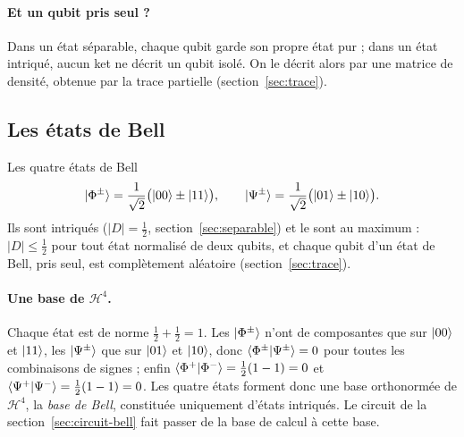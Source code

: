 \paragraph{Et un qubit pris seul ?} Dans un état séparable, chaque qubit garde son propre état pur ;
dans un état intriqué, aucun ket ne décrit un qubit isolé. On le décrit alors par une matrice de
densité, obtenue par la trace partielle (section~\ref{sec:trace}).

\subsection{Les états de Bell}\label{sec:bell}

\begin{definition}{Les quatre états de Bell}
\[
  |\Phi^{\pm}\rangle=\frac{1}{\sqrt2}\big(|00\rangle\pm|11\rangle\big),
  \qquad
  |\Psi^{\pm}\rangle=\frac{1}{\sqrt2}\big(|01\rangle\pm|10\rangle\big).
\]
Ils sont intriqués ($|D|=\frac12$, section~\ref{sec:separable}) et le sont au maximum :
$|D|\leq\frac12$ pour tout état normalisé de deux qubits, et chaque qubit d'un état de Bell,
pris seul, est complètement aléatoire (section~\ref{sec:trace}).
\end{definition}

\paragraph{Une base de $\mathcal{H}^4$.} Chaque état est de norme $\frac12+\frac12=1$. Les
$|\Phi^\pm\rangle$ n'ont de composantes que sur $|00\rangle$ et $|11\rangle$, les $|\Psi^\pm\rangle$ que sur
$|01\rangle$ et $|10\rangle$, donc $\langle \Phi^\pm|\Psi^\pm\rangle=0$ pour toutes les combinaisons de signes ;
enfin $\langle \Phi^+|\Phi^-\rangle=\frac12(1-1)=0$ et $\langle \Psi^+|\Psi^-\rangle=\frac12(1-1)=0$. Les quatre
états forment donc une base orthonormée de $\mathcal{H}^4$, la \emph{base de Bell}, constituée
uniquement d'états intriqués. Le circuit de la section~\ref{sec:circuit-bell} fait passer de la
base de calcul à cette base.

